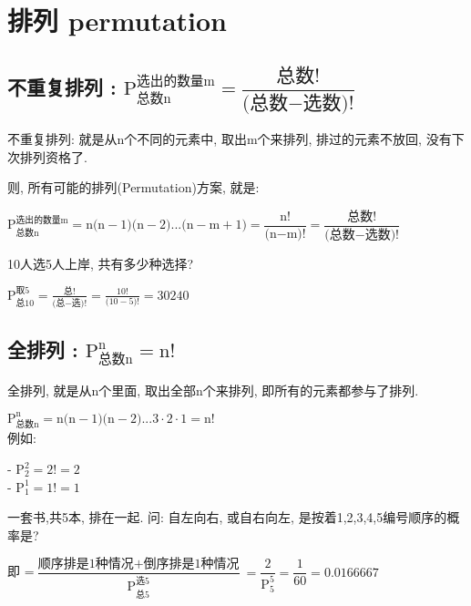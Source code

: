 \documentclass[UTF8]{ctexart}
\begin{document}
	
	
	
	\section{排列 permutation}
	
	
	
	
	
	\subsection{不重复排列 : $ \boxed{
		\text{P}_{\text{总数n}}^{\text{选出的数量m}}=\dfrac{\text{总数!}}{\text{(总数}-\text{选数)!}}		}$}
	
	不重复排列: 就是从n个不同的元素中, 取出m个来排列, 排过的元素不放回, 没有下次排列资格了. 
	
	则, 所有可能的排列(Permutation)方案, 就是:	
	
	$
	\boxed{		\text{P}_{\text{总数n}}^{\text{选出的数量m}}=\text{n(n}-1\text{)(n}-2\text{)...(n}-\text{m}+1\text{)}=\dfrac{\text{n!}}{\text{(n}-\text{m)!}}=\dfrac{\text{总数!}}{\text{(总数}-\text{选数)!}} 
	}
	$
	
	\begin{myEnvSample}
		10人选5人上岸, 共有多少种选择?
		
		$
		\text{P}_{\text{总}10}^{\text{取}5}=\frac{\text{总!}}{\text{(总}-\text{选)!}}=\frac{10!}{\text{(}10-5\text{)!}}=30240
		$
	\end{myEnvSample}
	
	
	
	
	
	\subsection{全排列 : $\boxed{
		\text{P}_{\text{总数n}}^{\text{n}}=\text{n!}	}$ }
	
	全排列, 就是从n个里面, 取出全部n个来排列, 即所有的元素都参与了排列.
	
	$ \boxed{
		\text{P}_{\text{总数n}}^{\text{n}}=\text{n(n}-1\text{)(n}-2\text{)}...3\cdot 2\cdot 1=\text{n!}
	}
	$ \\
	
	例如:
	
	- $	\text{P}_{2}^{2}=2!=2	$ \\	
	- $ \text{P}_{1}^{1}=1!=1$ \\
	
	\begin{myEnvSample}
		一套书,共5本, 排在一起. 问: 自左向右, 或自右向左, 是按着1,2,3,4,5编号顺序的概率是?
		
		即 =$
		\dfrac{\text{顺序排是1种情况}+\text{倒序排是1种情况}}{\text{P}_{\text{总}5}^{\text{选}5}}=\dfrac{2}{\text{P}_{5}^{5}}=\dfrac{1}{60}=0.0166667
		$
	\end{myEnvSample} 
	
\end{document}
